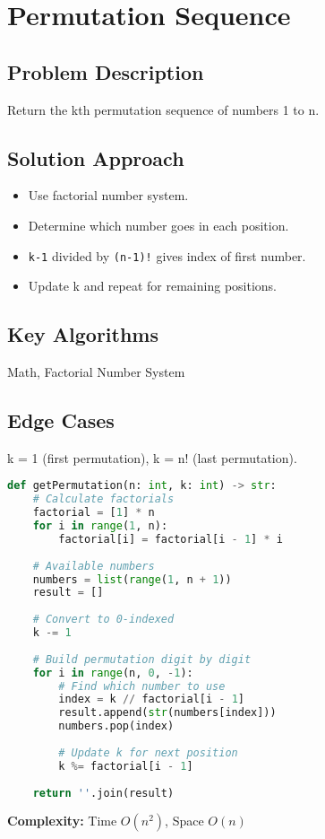 \documentclass[10pt, a4paper]{article}
\begin{document}
\section{Permutation Sequence}
\subsection*{Problem Description}
Return the kth permutation sequence of numbers 1 to n.

\subsection*{Solution Approach}
\begin{itemize}
    \item Use factorial number system.
    \item Determine which number goes in each position.
    \item \texttt{k-1} divided by \texttt{(n-1)!} gives index of first number.
    \item Update k and repeat for remaining positions.
\end{itemize}

\subsection*{Key Algorithms}
Math, Factorial Number System

\subsection*{Edge Cases}
k = 1 (first permutation), k = n! (last permutation).

\begin{lstlisting}[language=Python]
def getPermutation(n: int, k: int) -> str:
    # Calculate factorials
    factorial = [1] * n
    for i in range(1, n):
        factorial[i] = factorial[i - 1] * i
    
    # Available numbers
    numbers = list(range(1, n + 1))
    result = []
    
    # Convert to 0-indexed
    k -= 1
    
    # Build permutation digit by digit
    for i in range(n, 0, -1):
        # Find which number to use
        index = k // factorial[i - 1]
        result.append(str(numbers[index]))
        numbers.pop(index)
        
        # Update k for next position
        k %= factorial[i - 1]
    
    return ''.join(result)
\end{lstlisting}
\textbf{Complexity:} Time $O(n^2)$, Space $O(n)$
\end{document}
